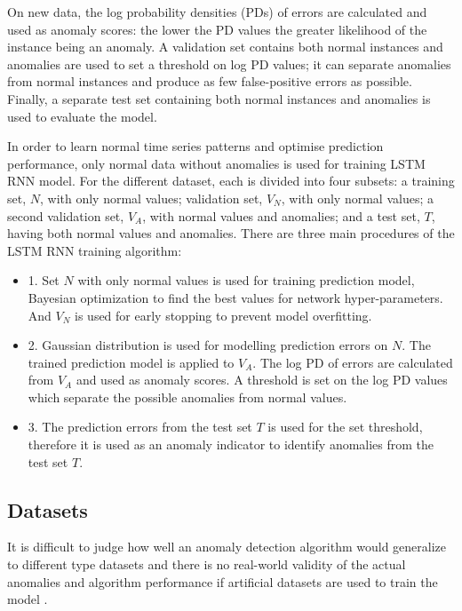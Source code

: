 \documentclass{article}
\begin{document}
On new data, the log probability densities (PDs) of errors are calculated and
used as anomaly scores: the lower the PD values the greater likelihood of the
instance being an anomaly. A validation set contains both normal instances and
anomalies are used to set a
threshold on log PD values; it can separate anomalies from normal
instances and produce as few false-positive errors as possible. Finally, a
separate test set containing both normal instances and anomalies is used to
evaluate the model.

In order to learn normal time series patterns and optimise prediction
performance, only normal data without anomalies is used for training LSTM RNN
model. For the different dataset, each is divided into four subsets: a training
set, $N$, with only normal values; validation set, $V_N$, with
only
normal values; a second validation set, $V_A$, with
normal values and anomalies; and a test set, $T$, having both normal values
and anomalies.
There are three main procedures of the LSTM RNN training algorithm:
\begin{itemize}
	\setlength{\itemsep}{1pt}
	\setlength{\parskip}{0pt}
	\setlength{\parsep}{0pt}
	\item 1. Set $N$ with only normal values is used for training prediction
model, Bayesian optimization \cite{8-BayesianOp} to find the best values
for network hyper-parameters. And $V_N$ is used for early stopping to prevent
model overfitting.
	\item 2. Gaussian distribution is used for modelling prediction errors on $N$.
The trained prediction model is applied to $V_A$. The log PD of errors are
calculated from $V_A$ and used as anomaly scores. A threshold is set on the log
PD values which separate the possible anomalies from normal values.
	\item 3. The prediction errors from the test set $T$ is used for the set
threshold, therefore it is used as an anomaly indicator to identify anomalies
from
the test set $T$.
\end{itemize}

\subsection{Datasets}
It is difficult to judge how well an anomaly detection algorithm
would generalize to different type datasets and there is no real-world validity
of the actual anomalies and algorithm performance if artificial
datasets are used to train the model \cite{7-lstmthisis}. 
\end{document}
